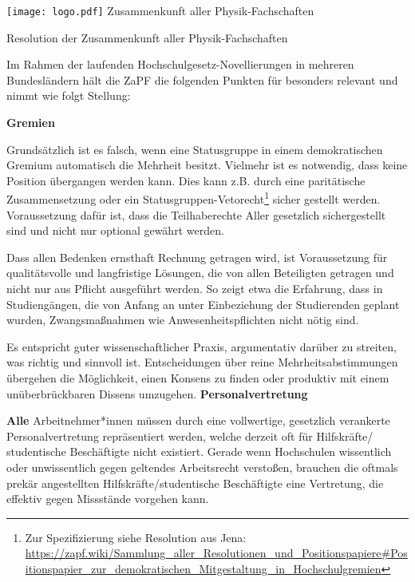 \documentclass[DIV=calc]{scrartcl}
\begin{document}
    \hspace{0.87\textwidth}
    \begin{minipage}{120pt}
        \vspace{-1.8cm}
        \texttt{[image: logo.pdf]}
        \centering
        \small Zusammenkunft aller Physik-Fachschaften
    \end{minipage}
    \begin{center}
        \huge{Resolution der Zusammenkunft aller Physik-Fachschaften}\vspace{.25\baselineskip}\\
        \normalsize
    \end{center}
    \vspace{1cm} 
Im Rahmen der laufenden Hochschulgesetz-Novellierungen in mehreren Bundesländern hält die ZaPF die folgenden Punkten für besonders relevant und nimmt wie folgt Stellung:

\textbf{Gremien}

Grundsätzlich ist es falsch, wenn eine Statusgruppe in einem demokratischen Gremium automatisch die Mehrheit besitzt. Vielmehr ist es notwendig, dass keine Position übergangen werden kann. Dies kann z.B. durch eine paritätische Zusammensetzung oder ein Statusgruppen-Vetorecht\footnote{Zur Spezifizierung siehe Resolution aus Jena: \url{https://zapf.wiki/Sammlung_aller_Resolutionen_und_Positionspapiere#Positionspapier_zur_demokratischen_Mitgestaltung_in_Hochschulgremien}} sicher gestellt werden. Voraussetzung dafür ist, dass die Teilhaberechte Aller gesetzlich sichergestellt sind und nicht nur optional gewährt werden.

Dass allen Bedenken ernsthaft Rechnung getragen wird, ist Voraussetzung für qualitätsvolle und langfristige Lösungen, die von allen Beteiligten getragen und nicht nur aus Pflicht ausgeführt werden. So zeigt etwa die Erfahrung, dass in Studiengängen, die von Anfang an unter Einbeziehung der Studierenden geplant wurden, Zwangsmaßnahmen wie Anwesenheitspflichten nicht nötig sind.

Es entspricht guter wissenschaftlicher Praxis, argumentativ darüber zu streiten, was richtig und sinnvoll ist. Entscheidungen über reine Mehrheitsabstimmungen übergehen die Möglichkeit, einen Konsens zu finden oder produktiv mit einem unüberbrückbaren Dissens umzugehen.
\newpage
\textbf{Personalvertretung}

\textbf{Alle} Arbeitnehmer*innen müssen durch eine vollwertige, gesetzlich verankerte Personalvertretung repräsentiert werden, welche derzeit oft für Hilfskräfte/ studentische Beschäftigte nicht existiert. Gerade wenn Hochschulen wissentlich oder unwissentlich gegen geltendes Arbeitsrecht verstoßen, brauchen die oftmals prekär angestellten Hilfskräfte/studentische Beschäftigte eine Vertretung, die effektiv gegen Missstände vorgehen kann.
\end{document}

